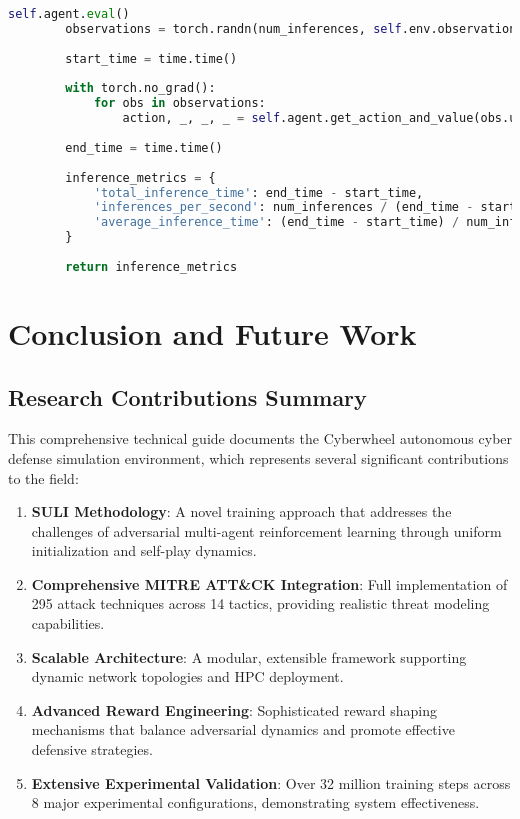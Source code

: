 \documentclass[12pt,a4paper]{article}
\begin{document}
\begin{lstlisting}[language=Python, caption=Performance Benchmarking]
        self.agent.eval()
        observations = torch.randn(num_inferences, self.env.observation_space.shape[0])
        
        start_time = time.time()
        
        with torch.no_grad():
            for obs in observations:
                action, _, _, _ = self.agent.get_action_and_value(obs.unsqueeze(0))
        
        end_time = time.time()
        
        inference_metrics = {
            'total_inference_time': end_time - start_time,
            'inferences_per_second': num_inferences / (end_time - start_time),
            'average_inference_time': (end_time - start_time) / num_inferences
        }
        
        return inference_metrics
\end{lstlisting}

\section{Conclusion and Future Work}

\subsection{Research Contributions Summary}

This comprehensive technical guide documents the Cyberwheel autonomous cyber defense simulation environment, which represents several significant contributions to the field:

\begin{enumerate}
    \item \textbf{SULI Methodology}: A novel training approach that addresses the challenges of adversarial multi-agent reinforcement learning through uniform initialization and self-play dynamics.
    
    \item \textbf{Comprehensive MITRE ATT\&CK Integration}: Full implementation of 295 attack techniques across 14 tactics, providing realistic threat modeling capabilities.
    
    \item \textbf{Scalable Architecture}: A modular, extensible framework supporting dynamic network topologies and HPC deployment.
    
    \item \textbf{Advanced Reward Engineering}: Sophisticated reward shaping mechanisms that balance adversarial dynamics and promote effective defensive strategies.
    
    \item \textbf{Extensive Experimental Validation}: Over 32 million training steps across 8 major experimental configurations, demonstrating system effectiveness.
\end{enumerate}
\end{document}

